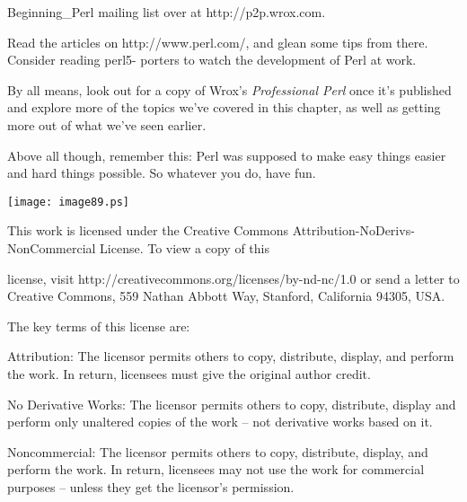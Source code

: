\documentclass[a4paper,11pt]{book}
\begin{document}
\noindent Beginning\_Perl mailing list over at http://p2p.wrox.com.

\noindent 

\noindent Read the articles on http://www.perl.com/, and glean some tips from there. Consider reading perl5- porters to watch the development of Perl at work.

\noindent 

\noindent By all means, look out for a copy of Wrox's \textit{Professional Perl }once it's published and explore more of the topics we've covered in this chapter, as well as getting more out of what we've seen earlier.

\noindent 

\noindent Above all though, remember this: Perl was supposed to make easy things easier and hard things possible. So whatever you do, have fun.

\noindent  

\noindent  

\noindent  

\noindent  

\noindent 

\noindent \texttt{[image: image89.ps]}

\noindent 

\noindent This work is licensed under the Creative Commons Attribution-NoDerivs-NonCommercial License. To view a copy of this

\noindent license, visit http://creativecommons.org/licenses/by-nd-nc/1.0 or send a letter to Creative Commons, 559 Nathan Abbott Way, Stanford, California 94305, USA.

\noindent 

\noindent The key terms of this license are:

\noindent 

\noindent Attribution: The licensor permits others to copy, distribute, display, and perform the work. In return, licensees must give the original author credit.

\noindent 

\noindent No  Derivative  Works: The licensor permits others to copy, distribute, display and perform only unaltered copies of the work -- not derivative works based on it.

\noindent 

\noindent Noncommercial: The licensor permits others to copy, distribute, display, and perform the work. In return, licensees may not use the work for commercial purposes -- unless they get the licensor's permission.
\end{document}
